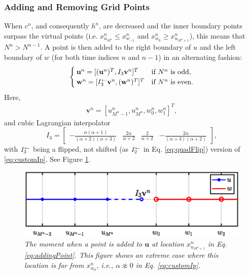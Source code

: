 \subsubsection{Adding and Removing Grid Points}\label{sec:addRemove}
When $c^n$, and consequently $h^n$, are decreased and the inner boundary points surpass the virtual points (i.e. $x_{u_{M^n}}^n \leq x_{w_{-1}}^n$ and $x_{w_0}^n \geq x_{u_{M^n+1}}^n$), this means that $N^n >  N^{n-1}$. A point is then added to the right boundary of $u$ and the left boundary of $w$ (for both time indices $n$ and $n-1$) in an alternating fashion: 
\begin{equation}\label{eq:addingPoint}
        \begin{cases}\mathbf{u}^n = [(\mathbf{u}^n)^T, I_3\mathbf{v}^n]^T & \text{if $N^n $ is odd},\\
        \mathbf{w}^n = [I_3^\leftarrow\mathbf{v}^n, (\mathbf{w}^n)^T]^T & \text{if $ N^n$ is even}.
        \end{cases}
\end{equation}
Here, 
\begin{align*}
\mathbf{v}^n = [u_{M^n-1}^n, u_{M^n}^n, w_0^n, w_1^n]^T,%
\end{align*}
and cubic Lagrangian interpolator
\begin{equation}\label{eq:customIp}
    I_3 = \begin{bmatrix} -\frac{\alpha(\alpha+1)}{(\alpha+2)(\alpha+3)} &\frac{2\alpha}{\alpha+2} &\frac{2}{\alpha+2} 
    &-\frac{2\alpha}{(\alpha+3)(\alpha+2)}
    \end{bmatrix},
\end{equation}
with $I_3^\leftarrow$ being a flipped, not shifted (as $I_2^\leftarrow$ in Eq. \eqref{eq:quadFlip}) version of \eqref{eq:customIp}.
See Figure \ref{fig:addingPoint}.
%
\begin{figure}[t]
    \centering
\includegraphics[width=\figwidth\columnwidth]{figures/addingGridPointNarrow.eps}
\caption{\label{fig:addingPoint}{\it The moment when a point is added to $\mathbf{u}$ at location $x_{u_{M^n+1}}^n$ in Eq. \eqref{eq:addingPoint}. This figure shows an extreme case where this location is far from $x_{w_0}^n$, i.e., $\alpha \not\approx 0$ in Eq. \eqref{eq:customIp}.}}
\end{figure}
